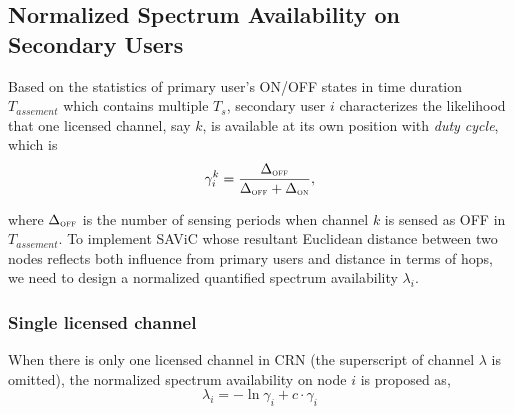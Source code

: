 




\subsection{Normalized Spectrum Availability on Secondary Users}\label{CA_VC_likelihood}
Based on the statistics of primary user's ON/OFF states in time duration $T_{assement}$ which contains multiple $T_s$, secondary user $i$ characterizes the likelihood that one licensed channel, say $k$, is available at its own position with \textit{duty cycle}, which is
\begin{equation}
\label{gamma}
\gamma_i^k = \frac{\Delta_{\textsc{\tiny OFF}}}{\Delta_{\textsc{\tiny OFF}}+\Delta_{\textsc{\tiny ON}}},
\end{equation}

where $\Delta_{\textsc{\tiny OFF}}$ is the number of sensing periods when channel $k$ is sensed as OFF in $T_{assement}$.
To implement SAViC whose resultant Euclidean distance between two nodes reflects both influence from primary users and distance in terms of hops, we need to design a normalized quantified spectrum availability $\lambda_i$.

\subsubsection*{Single licensed channel}
When there is only one licensed channel in CRN (the superscript of channel $\lambda$ is omitted), the normalized spectrum availability on node $i$ is proposed as,%
\begin{equation}
\lambda_i = -\ln \gamma_i+ c \cdot \gamma_i
\label{singCH_onehop_dc_metric}
\end{equation}

